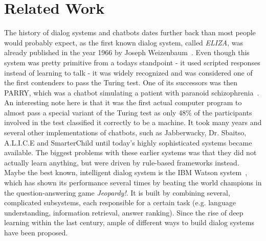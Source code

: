 \chapter{Related Work}
\label{related_work}

The history of dialog systems and chatbots dates further back than most people would probably expect, as the first known dialog system, called \emph{ELIZA}, was already published in the year 1966 by Joseph Weizenbaum~\cite{Weizenbaum:1966}. Even though this system was pretty primitive from a todays standpoint - it used scripted responses instead of learning to talk - it was widely recognized and was considered one of the first contenders to pass the Turing test. One of its successors was then PARRY, which was a chatbot simulating a patient with paranoid schizophrenia~\cite{Colby:1974}. An interesting note here is that it was the first actual computer program to almost pass a special variant of the Turing test as only 48\% of the participants involved in the test classified it correctly to be a machine. It took many years and several other implementations of chatbots, such as Jabberwacky, Dr. Sbaitso, A.L.I.C.E and SmarterChild until today's highly sophisticated systems became available. The biggest problems with these earlier systems was that they did not actually learn anything, but were driven by rule-based frameworks instead. Maybe the best known, intelligent dialog system is the IBM Watson system~\cite{Ferrucci:2012}, which has shown its performance several times by beating the world champions in the question-answering game \emph{Jeopardy!}. It is built by combining several, complicated subsystems, each responsible for a certain task (e.g. language understanding, information retrieval, answer ranking). Since the rise of deep learning within the last century, ample of different ways to build dialog systems have been proposed.

